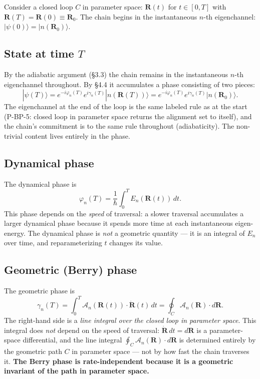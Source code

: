 \documentclass[11pt,a4paper]{article}
\begin{document}
Consider a closed loop $C$ in parameter space: $\mathbf{R}(t)$ for $t \in [0,T]$ with $\mathbf{R}(T) = \mathbf{R}(0) \equiv \mathbf{R}_0$. The chain begins in the instantaneous $n$-th eigenchannel: $|\psi(0)\rangle = |n(\mathbf{R}_0)\rangle$.

\subsection{State at time $T$}

By the adiabatic argument (\S3.3) the chain remains in the instantaneous $n$-th eigenchannel throughout. By \S4.4 it accumulates a phase consisting of two pieces:
\[
|\psi(T)\rangle = e^{-i\varphi_n(T)} e^{i\gamma_n(T)} |n(\mathbf{R}(T))\rangle = e^{-i\varphi_n(T)} e^{i\gamma_n(T)} |n(\mathbf{R}_0)\rangle.
\]
The eigenchannel at the end of the loop is the same labeled rule as at the start (P-BP-5: closed loop in parameter space returns the alignment set to itself), and the chain's commitment is to the same rule throughout (adiabaticity). The non-trivial content lives entirely in the phase.

\subsection{Dynamical phase}

The dynamical phase is
\[
\varphi_n(T) = \frac{1}{\hbar} \int_0^T E_n(\mathbf{R}(t)) \, dt.
\]
This phase depends on the \emph{speed} of traversal: a slower traversal accumulates a larger dynamical phase because it spends more time at each instantaneous eigen-energy. The dynamical phase is \emph{not} a geometric quantity --- it is an integral of $E_n$ over time, and reparameterizing $t$ changes its value.

\subsection{Geometric (Berry) phase}

The geometric phase is
\[
\gamma_n(T) = \int_0^T \mathcal{A}_n(\mathbf{R}(t)) \cdot \dot{\mathbf{R}}(t) \, dt
= \oint_C \mathcal{A}_n(\mathbf{R}) \cdot d\mathbf{R}.
\]
The right-hand side is a \emph{line integral over the closed loop in parameter space}. This integral does \emph{not} depend on the speed of traversal: $\dot{\mathbf{R}}\,dt = d\mathbf{R}$ is a parameter-space differential, and the line integral $\oint_C \mathcal{A}_n(\mathbf{R})\cdot d\mathbf{R}$ is determined entirely by the geometric path $C$ in parameter space --- not by how fast the chain traverses it. \textbf{The Berry phase is rate-independent because it is a geometric invariant of the path in parameter space.}
\end{document}
